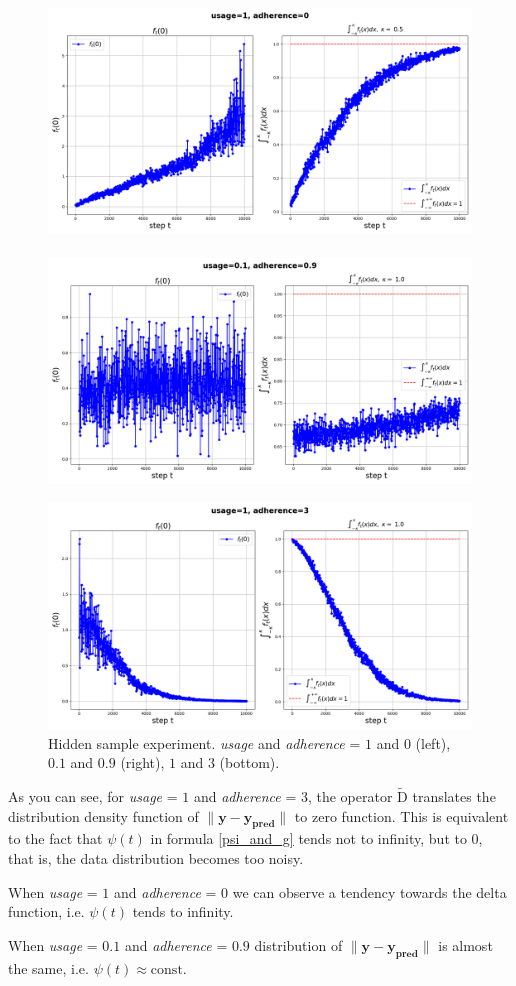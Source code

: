\documentclass{article}
\begin{document}
        \begin{figure}[h!]
            \centering
            \includegraphics[width=0.49\linewidth]{pictures/ft0_sample_1_0.png}~~
            ~~\includegraphics[width=0.49\linewidth]{pictures/ft0_sample_0.1_0.9.png}
            
            \includegraphics[width=0.49\linewidth]{pictures/ft0_sample_1_3.png}
            
            \caption{Hidden sample experiment. \textit{usage} and \textit{adherence} = $1$ and $0$ (left), $0.1$ and $0.9$ (right), $1$ and $3$ (bottom).}
            \label{delta_sample}
        \end{figure}

        As you can see, for \textit{usage} = $1$ and \textit{adherence} = $3$, the operator $\widetilde{\text{D}}$ translates the distribution density function of $\|\mathbf{y} - \mathbf{y_{\text{pred}}}\|$ to zero function. This is equivalent to the fact that $\psi(t)$ in formula \ref{psi_and_g} tends not to infinity, but to $0$, that is, the data distribution becomes too noisy.
        
        When \textit{usage} = $1$ and \textit{adherence} = $0$ we can observe a tendency towards the delta function, i.e. $\psi(t)$ tends to infinity. 

        When \textit{usage} = $0.1$ and \textit{adherence} = $0.9$ distribution of $\|\mathbf{y} - \mathbf{y_{\text{pred}}}\|$ is almost the same, i.e. $\psi(t) \approx \text{const}.$
\end{document}
